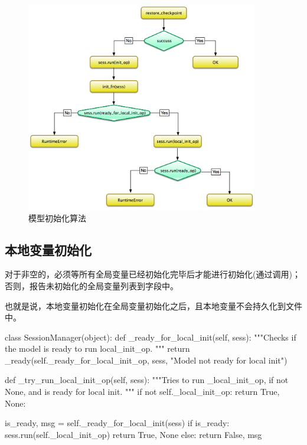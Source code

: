 \begin{content}
\begin{figure}[!htbp]
\centering
\includegraphics[width=0.9\textwidth]{figures/py-train-session-initialization-algo.png}
\caption{模型初始化算法}
 \label{fig:py-train-session-initialization-algo}
\end{figure}

\subsection{本地变量初始化}

对于非空的，必须等所有全局变量已经初始化完毕后才能进行初始化(通过调用)；否则，报告未初始化的全局变量列表到字段中。

也就是说，本地变量初始化在全局变量初始化之后，且本地变量不会持久化到文件中。

\begin{leftbar}
\begin{python}
class SessionManager(object):
  def _ready_for_local_init(self, sess):
    """Checks if the model is ready to run local_init_op.
    """
    return _ready(self._ready_for_local_init_op, sess,
                  "Model not ready for local init")

  def _try_run_local_init_op(self, sess):
    """Tries to run _local_init_op, if not None, 
       and is ready for local init.
    """
    if not self._local_init_op:
      return True, None:
    
    is_ready, msg = self._ready_for_local_init(sess)
    if is_ready:
      sess.run(self._local_init_op)
      return True, None
    else:
      return False, msg
\end{python}
\end{leftbar}


\end{content}
